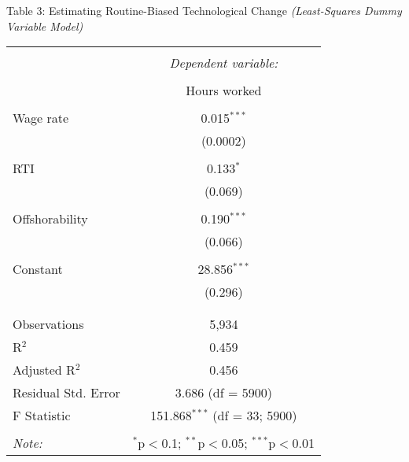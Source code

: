 \documentclass[12pt]{article}
\begin{document}
\begin{table}[!htbp] \centering 
Table 3: Estimating Routine-Biased Technological Change \textit{(Least-Squares Dummy Variable Model)} 
  \label{} 
\begin{tabular}{@{\extracolsep{5pt}}lc} 
\\[-1.8ex]\hline 
\hline \\[-1.8ex] 
 & \multicolumn{1}{c}{\textit{Dependent variable:}} \\ 
\cline{2-2} 
\\[-1.8ex] & Hours worked \\ 
\hline \\[-1.8ex] 
 Wage rate & 0.015$^{***}$ \\ 
  & (0.0002) \\ 
& \\ 
 RTI & 0.133$^{*}$ \\ 
  & (0.069) \\ 
& \\ 
 Offshorability & 0.190$^{***}$ \\ 
  & (0.066) \\ 
& \\ 
 Constant & 28.856$^{***}$ \\ 
  & (0.296) \\  
  & \\ 
\hline \\[-1.8ex] 
Observations & 5,934 \\ 
R$^{2}$ & 0.459 \\ 
Adjusted R$^{2}$ & 0.456 \\ 
Residual Std. Error & 3.686 (df = 5900) \\ 
F Statistic & 151.868$^{***}$ (df = 33; 5900) \\ 
\hline 
\hline \\[-1.8ex] 
\textit{Note:}  & \multicolumn{1}{r}{$^{*}$p$<$0.1; $^{**}$p$<$0.05; $^{***}$p$<$0.01} \\ 
\end{tabular} 
\end{table} 

\newpage
\end{document}
